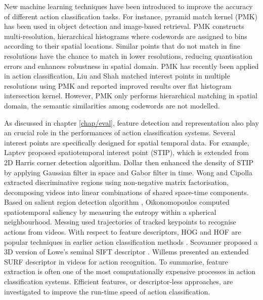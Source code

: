 New machine learning techniques have been introduced to improve the accuracy of different action classification tasks.  
For instance, pyramid match kernel (PMK) \cite{Grauman2005} has been used in object detection and image-based retrieval. PMK constructs multi-resolution, hierarchical histograms where codewords are assigned to bins according to their spatial locations. Similar points that do not match in fine resolutions have the chance to match in lower resolutions, reducing quantisation errors and enhances robustness in spatial domain. PMK has recently been applied in action classification, Liu and Shah \cite{Liu2008} matched interest points in multiple resolutions using PMK and reported improved results over flat histogram intersection kernel. 
However, PMK only performs hierarchical matching in spatial domain, the semantic similarities among codewords are not modelled.  

As discussed in chapter \ref{chap/eval}, feature detection and representation also play an crucial role in the performances of action classification systems. Several interest points are specifically designed for spatial temporal data. For example, Laptev \cite{Laptev2005} proposed spatiotemporal interest point (STIP), which is extended from 2D Harris corner detection algorithm. Dollar \etal \cite{Dollar2005} then enhanced the density of STIP by applying Gaussian filter in space and Gabor filter in time.  
Wong and Cipolla \cite{Wong2007a} extracted discriminative regions using non-negative matrix factorisation, decomposing videos into linear combinations of shared space-time components.
Based on salient region detection algorithm \cite{Mikolajczyk2004}, Oikonomopoulos \etal \cite{Oikonomopoulos2005} computed spatiotemporal saliency by measuring the entropy within a spherical neighbourhood. Messing \etal \cite{Messing2009} used trajectories of tracked keypoints to recognise actions from videos. 
With respect to feature descriptors, HOG and HOF are popular techniques in earlier action classification methods \cite{Dollar2005, Niebles2008, Schuldt2004}. Scovanner \etal \cite{Scovanner2007} proposed a 3D version of Lowe's seminal SIFT descriptor \cite{Lowe2004}. Willems \etal \cite{Willems2009} presented an extended SURF descriptor in videos for action recognition.  
To summarise, feature extraction is often one of the most computationally expensive processes in action classification systems. Efficient features, or descriptor-less approaches, are investigated to improve the run-time speed of action classification.  

